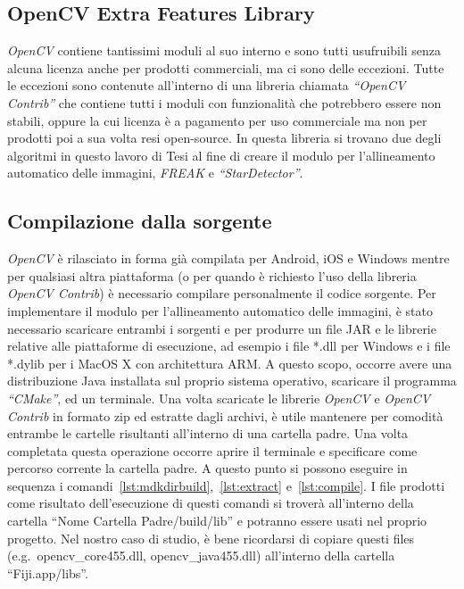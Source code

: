 \subsection{OpenCV Extra Features Library}
\noindent \textit{OpenCV} contiene tantissimi moduli al suo interno e sono tutti usufruibili senza alcuna licenza anche per prodotti commerciali, ma ci sono delle eccezioni. Tutte le eccezioni sono contenute all'interno di una libreria chiamata \textit{``OpenCV Contrib''} che contiene tutti i moduli con funzionalità che potrebbero essere non stabili, oppure la cui licenza è a pagamento per uso commerciale ma non per prodotti poi a sua volta resi open-source. In questa libreria si trovano due degli algoritmi in questo lavoro di Tesi al fine di creare il modulo per l'allineamento automatico delle immagini, \textit{FREAK} e \textit{``StarDetector''}.

\subsection{Compilazione dalla sorgente}
\noindent \textit{OpenCV} è rilasciato in forma già compilata per Android, iOS e Windows mentre per qualsiasi altra piattaforma (o per quando è richiesto l'uso della libreria \textit{OpenCV Contrib}) è necessario compilare personalmente il codice sorgente. Per implementare il modulo per l'allineamento automatico delle immagini, è stato necessario scaricare entrambi i sorgenti e per produrre un file JAR e le librerie relative alle piattaforme di esecuzione, ad esempio i file *.dll per Windows e i file *.dylib per i MacOS X con architettura ARM\@.
A questo scopo, occorre avere una distribuzione Java installata sul proprio sistema operativo, scaricare il programma \textit{``CMake''}, ed un terminale. Una volta scaricate le librerie \textit{OpenCV} e \textit{OpenCV Contrib} in formato zip ed estratte dagli archivi, è utile mantenere per comodità entrambe le cartelle risultanti all'interno di una cartella padre. Una volta completata questa operazione occorre aprire il terminale e specificare come percorso corrente la cartella padre. A questo punto si possono eseguire in sequenza i comandi~\ref{lst:mdkdirbuild},~\ref{lst:extract} e~\ref{lst:compile}. I file prodotti come risultato dell'esecuzione di questi comandi si troverà all'interno della cartella ``{Nome Cartella Padre}/build/lib'' e potranno essere usati nel proprio progetto. Nel nostro caso di studio, è bene ricordarsi di copiare questi files (e.g.\ opencv\_core455.dll, opencv\_java455.dll) all'interno della cartella ``Fiji.app/libs''.

